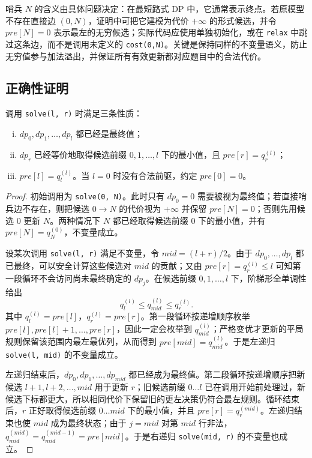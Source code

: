 \documentclass[lang=cn,a4paper,newtx,code=minted,bibtex]{elegantpaper}
\begin{document}
哨兵 $N$ 的含义由具体问题决定：在最短路式 DP 中，它通常表示终点。若原模型不存在直接边 $(0,N)$，证明中可把它建模为代价 $+\infty$ 的形式候选，并令 $pre[N]=0$ 表示最左的无穷候选；实际代码应使用单独初始化，或在 \lstinline{relax} 中跳过这条边，而不是调用未定义的 \lstinline{cost(0,N)}。关键是保持同样的不变量语义，防止无穷值参与加法溢出，并保证所有有效更新都对应题目中的合法代价。

\subsection{正确性证明}

\begin{lemma}[递归不变量]
调用 \lstinline{solve(l, r)} 时满足三条性质：
\begin{enumerate}[(i)]
  \item $dp_0,dp_1,\ldots,dp_l$ 都已经是最终值；
  \item $dp_r$ 已经等价地取得候选前缀 $0,1,\ldots,l$ 下的最小值，且 $pre[r]=q_r^{(l)}$；
  \item $pre[l]=q_l^{(l)}$。当 $l=0$ 时没有合法前驱，约定 $pre[0]=0$。
\end{enumerate}
\end{lemma}

\begin{proof}
初始调用为 \lstinline{solve(0, N)}。此时只有 $dp_0=0$ 需要被视为最终值；若直接哨兵边不存在，则把候选 $0\to N$ 的代价视为 $+\infty$ 并保留 $pre[N]=0$；否则先用候选 $0$ 更新 $N$。两种情况下 $N$ 都已经取得候选前缀 $0$ 下的最小值，并有 $pre[N]=q_N^{(0)}$，不变量成立。

设某次调用 \lstinline{solve(l, r)} 满足不变量，令 $mid=(l+r)/2$。由于 $dp_0,\ldots,dp_l$ 都已最终，可以安全计算这些候选对 $mid$ 的贡献；又由 $pre[r]=q_r^{(l)}\le l$ 可知第一段循环不会访问尚未最终确定的 $dp_j$。在候选前缀 $0,1,\ldots,l$ 下，阶梯形全单调性给出
\[
  q_l^{(l)}\le q_{mid}^{(l)}\le q_r^{(l)}.
\]
其中 $q_l^{(l)}=pre[l]$，$q_r^{(l)}=pre[r]$。第一段循环按递增顺序枚举 $pre[l],pre[l]+1,\ldots,pre[r]$，因此一定会枚举到 $q_{mid}^{(l)}$；严格变优才更新的平局规则保留该范围内最左最优列，从而得到 $pre[mid]=q_{mid}^{(l)}$。于是左递归 \lstinline{solve(l, mid)} 的不变量成立。

左递归结束后，$dp_0,dp_1,\ldots,dp_{mid}$ 都已经成为最终值。第二段循环按递增顺序把新候选 $l+1,l+2,\ldots,mid$ 用于更新 $r$；旧候选前缀 $0\ldots l$ 已在调用开始前处理过，新候选下标都更大，所以相同代价下保留旧的更左决策仍符合最左规则。循环结束后，$r$ 正好取得候选前缀 $0\ldots mid$ 下的最小值，并且 $pre[r]=q_r^{(mid)}$。左递归结束也使 $mid$ 成为最终状态；由于 $j=mid$ 对第 $mid$ 行非法，$q_{mid}^{(mid)}=q_{mid}^{(mid-1)}=pre[mid]$。于是右递归 \lstinline{solve(mid, r)} 的不变量也成立。
\end{proof}
\end{document}
